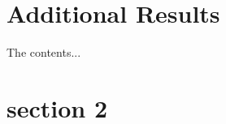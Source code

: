 \documentclass{article}
\begin{document}
\clearpage
\nocite{*}
\singlespacing



\clearpage





\clearpage





\clearpage

\begin{appendices}
  \section{Additional Results}
  The contents...
  \section{section 2}
\end{appendices}
\end{document}
